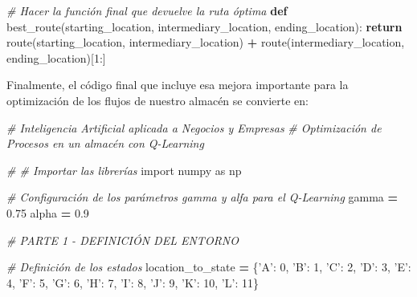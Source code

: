 \documentclass[]{book}
\newenvironment{Shaded}{\begin{snugshade}}{\end{snugshade}}
\newcommand{\CommentTok}[1]{\textcolor[rgb]{0.56,0.35,0.01}{\textit{#1}}}
\newcommand{\ControlFlowTok}[1]{\textcolor[rgb]{0.13,0.29,0.53}{\textbf{#1}}}
\newcommand{\DecValTok}[1]{\textcolor[rgb]{0.00,0.00,0.81}{#1}}
\newcommand{\FloatTok}[1]{\textcolor[rgb]{0.00,0.00,0.81}{#1}}
\newcommand{\ImportTok}[1]{#1}
\newcommand{\KeywordTok}[1]{\textcolor[rgb]{0.13,0.29,0.53}{\textbf{#1}}}
\newcommand{\NormalTok}[1]{#1}
\newcommand{\OperatorTok}[1]{\textcolor[rgb]{0.81,0.36,0.00}{\textbf{#1}}}
\newcommand{\StringTok}[1]{\textcolor[rgb]{0.31,0.60,0.02}{#1}}
\begin{document}
\begin{Shaded}
\begin{Highlighting}[]
\CommentTok{# Hacer la función final que devuelve la ruta óptima}
\KeywordTok{def}\NormalTok{ best_route(starting_location, intermediary_location, ending_location):}
    \ControlFlowTok{return}\NormalTok{ route(starting_location, intermediary_location)}
           \OperatorTok{+}\NormalTok{ route(intermediary_location, ending_location)[}\DecValTok{1}\NormalTok{:]}
\end{Highlighting}
\end{Shaded}

Finalmente, el código final que incluye esa mejora importante para la optimización de los flujos de nuestro almacén se convierte en:

\begin{Shaded}
\begin{Highlighting}[]
\CommentTok{# Inteligencia Artificial aplicada a Negocios y Empresas}
\CommentTok{# Optimización de Procesos en un almacén con Q-Learning}

\CommentTok{# # Importar las librerías}
\ImportTok{import}\NormalTok{ numpy }\ImportTok{as}\NormalTok{ np}

\CommentTok{# Configuración de los parámetros gamma y alfa para el Q-Learning}
\NormalTok{gamma }\OperatorTok{=} \FloatTok{0.75}
\NormalTok{alpha }\OperatorTok{=} \FloatTok{0.9}

\CommentTok{# PARTE 1 - DEFINICIÓN DEL ENTORNO}

\CommentTok{# Definición de los estados}
\NormalTok{location_to_state }\OperatorTok{=}\NormalTok{ \{}\StringTok{'A'}\NormalTok{: }\DecValTok{0}\NormalTok{,}
                     \StringTok{'B'}\NormalTok{: }\DecValTok{1}\NormalTok{,}
                     \StringTok{'C'}\NormalTok{: }\DecValTok{2}\NormalTok{,}
                     \StringTok{'D'}\NormalTok{: }\DecValTok{3}\NormalTok{,}
                     \StringTok{'E'}\NormalTok{: }\DecValTok{4}\NormalTok{,}
                     \StringTok{'F'}\NormalTok{: }\DecValTok{5}\NormalTok{,}
                     \StringTok{'G'}\NormalTok{: }\DecValTok{6}\NormalTok{,}
                     \StringTok{'H'}\NormalTok{: }\DecValTok{7}\NormalTok{,}
                     \StringTok{'I'}\NormalTok{: }\DecValTok{8}\NormalTok{,}
                     \StringTok{'J'}\NormalTok{: }\DecValTok{9}\NormalTok{,}
                     \StringTok{'K'}\NormalTok{: }\DecValTok{10}\NormalTok{,}
                     \StringTok{'L'}\NormalTok{: }\DecValTok{11}\NormalTok{\}}


\end{Highlighting}
\end{Shaded}
\end{document}
